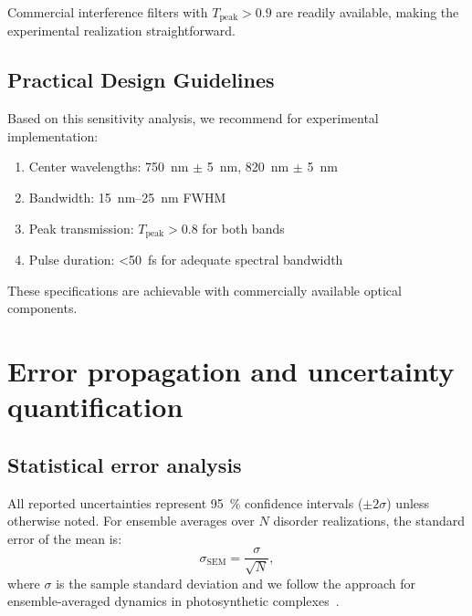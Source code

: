 \documentclass[11pt,a4paper]{article}
\begin{document}
Commercial interference filters with $T_{\mathrm{peak}} > 0.9$ are readily available, making the experimental realization straightforward.

\subsection{Practical Design Guidelines}

Based on this sensitivity analysis, we recommend for experimental implementation:
\begin{enumerate}
    \item Center wavelengths: \SI{750}{\nano\meter} $\pm$ \SI{5}{\nano\meter}, \SI{820}{\nano\meter} $\pm$ \SI{5}{\nano\meter}
    \item Bandwidth: \SIrange{15}{25}{\nano\meter} FWHM
    \item Peak transmission: $T_{\mathrm{peak}} > 0.8$ for both bands
    \item Pulse duration: \SI{<50}{\femto\second} for adequate spectral bandwidth
\end{enumerate}

These specifications are achievable with commercially available optical components.


\section{Error propagation and uncertainty quantification}

\subsection{Statistical error analysis}

All reported uncertainties represent \SI{95}{\percent} confidence intervals ($\pm 2\sigma$) unless otherwise noted. For ensemble averages over $N$ disorder realizations, the standard error of the mean is:
\begin{equation}
\sigma_{\mathrm{SEM}} = \frac{\sigma}{\sqrt{N}},
\label{eq:SEM}
\end{equation}
where $\sigma$ is the sample standard deviation and we follow the approach for ensemble-averaged dynamics in photosynthetic complexes~\cite{Moix2011}.
\end{document}
